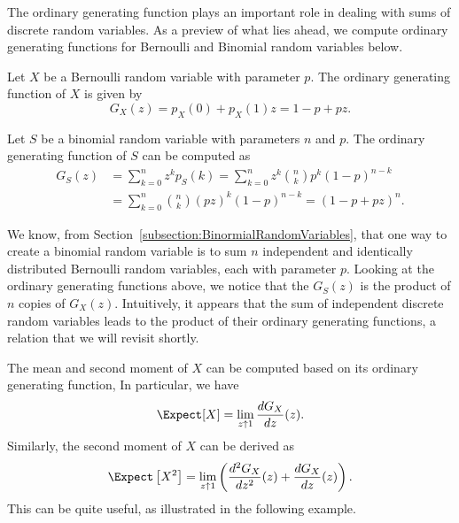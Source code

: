 The ordinary generating function plays an important role in dealing with sums of discrete random variables.
As a preview of what lies ahead, we compute ordinary generating functions for Bernoulli and Binomial random variables below.

\begin{example}
Let $X$ be a Bernoulli random variable with parameter $p$.
The ordinary generating function of $X$ is given by
\begin{equation*}
G_X(z) = p_X(0) + p_X(1) z
= 1 - p + pz .
\end{equation*}
\end{example}

\begin{example}
Let $S$ be a binomial random variable with parameters $n$ and $p$.
The ordinary generating function of $S$ can be computed as
\begin{equation*}
\begin{split}
G_S(z) &= \sum_{k=0}^{n} z^k p_S (k)
= \sum_{k=0}^{n} z^k \binom{n}{k} p^k (1 - p)^{n-k} \\
&= \sum_{k=0}^{n} \binom{n}{k} (pz)^k (1 - p)^{n-k}
= (1 - p + pz)^n .
\end{split}
\end{equation*}
\end{example}

We know, from Section~\ref{subsection:BinormialRandomVariables}, that one way to create a binomial random variable is to sum $n$ independent and identically distributed Bernoulli random variables, each with parameter $p$.
Looking at the ordinary generating functions above, we notice that the $G_S(z)$ is the product of $n$ copies of $G_X(z)$.
Intuitively, it appears that the sum of independent discrete random variables leads to the product of their ordinary generating functions, a relation that we will revisit shortly.

The mean and second moment of $X$ can be computed based on its ordinary generating function,
In particular, we have
\begin{equation*}
\Expect [X] = \lim_{z \uparrow 1} \frac{d G_X}{dz}(z) .
\end{equation*}
Similarly, the second moment of $X$ can be derived as
\begin{equation*}
\Expect \left[ X^2 \right]
= \lim_{z \uparrow 1} \left( \frac{d^2 G_X}{dz^2}(z) + \frac{d G_X}{dz}(z) \right) .
\end{equation*}
This can be quite useful, as illustrated in the following example.

